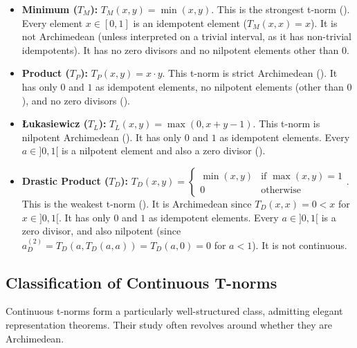 \begin{example}
  
  \begin{itemize}
    \item \textbf{Minimum ($T_M$):} $T_M(x, y) = \min(x, y)$.
    This is the strongest t-norm (\cite[Rem.~1.5(i)]{Klement2000}). Every element $x \in [0,1]$ is an idempotent element ($T_M(x,x)=x$). It is not Archimedean (unless interpreted on a trivial interval, as it has non-trivial idempotents). It has no zero divisors and no nilpotent elements other than 0.
    \item \textbf{Product ($T_P$):} $T_P(x, y) = x \cdot y$.
    This t-norm is strict Archimedean (\cite[Ex.~2.14(i)]{Klement2000}). It has only $0$ and $1$ as idempotent elements, no nilpotent elements (other than $0$), and no zero divisors (\cite[Ex.~2.2(i)]{Klement2000}).
    \item \textbf{Łukasiewicz ($T_L$):} $T_L(x, y) = \max(0, x + y - 1)$.
    This t-norm is nilpotent Archimedean (\cite[Ex.~2.14(i)]{Klement2000}). It has only $0$ and $1$ as idempotent elements. Every $a \in ]0,1[$ is a nilpotent element and also a zero divisor (\cite[Ex.~2.2(i)]{Klement2000}).
    \item \textbf{Drastic Product ($T_D$):} $T_D(x, y) = \begin{cases} \min(x,y) & \text{if } \max(x,y)=1 \\ 0 & \text{otherwise} \end{cases}$.
    This is the weakest t-norm (\cite[Rem.~1.5(i)]{Klement2000}). It is Archimedean since $T_D(x,x)=0 < x$ for $x \in ]0,1[$. It has only $0$ and $1$ as idempotent elements. Every $a \in ]0,1[$ is a zero divisor, and also nilpotent (since $a_D^{(2)} = T_D(a, T_D(a,a)) = T_D(a,0) = 0$ for $a<1$). It is not continuous.
  \end{itemize}
\end{example}

\subsection{Classification of Continuous T-norms}

Continuous t-norms form a particularly well-structured class, admitting elegant representation theorems. Their study often revolves around whether they are Archimedean.

